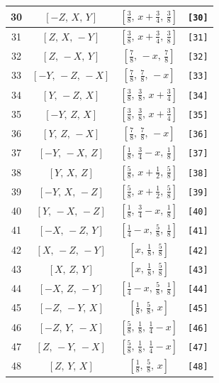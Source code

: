 \documentclass[fleqn,8pt]{jsarticle}
\begin{document}
\begin{longtable}{cccc}
30 & $\left[ - Z,\, X,\, Y \right]$ & $\left[ \frac{3}{8},\, x + \frac{3}{4},\, \frac{3}{8} \right]$ & {\tt [30]} \\ \hline
31 & $\left[ Z,\, X,\, - Y \right]$ & $\left[ \frac{3}{8},\, x + \frac{3}{4},\, \frac{3}{8} \right]$ & {\tt [31]} \\ \hline
32 & $\left[ Z,\, - X,\, Y \right]$ & $\left[ \frac{7}{8},\, - x,\, \frac{7}{8} \right]$ & {\tt [32]} \\ \hline
33 & $\left[ - Y,\, - Z,\, - X \right]$ & $\left[ \frac{7}{8},\, \frac{7}{8},\, - x \right]$ & {\tt [33]} \\ \hline
34 & $\left[ Y,\, - Z,\, X \right]$ & $\left[ \frac{3}{8},\, \frac{3}{8},\, x + \frac{3}{4} \right]$ & {\tt [34]} \\ \hline
35 & $\left[ - Y,\, Z,\, X \right]$ & $\left[ \frac{3}{8},\, \frac{3}{8},\, x + \frac{3}{4} \right]$ & {\tt [35]} \\ \hline
36 & $\left[ Y,\, Z,\, - X \right]$ & $\left[ \frac{7}{8},\, \frac{7}{8},\, - x \right]$ & {\tt [36]} \\ \hline
37 & $\left[ - Y,\, - X,\, Z \right]$ & $\left[ \frac{1}{8},\, \frac{3}{4} - x,\, \frac{1}{8} \right]$ & {\tt [37]} \\ \hline
38 & $\left[ Y,\, X,\, Z \right]$ & $\left[ \frac{5}{8},\, x + \frac{1}{2},\, \frac{5}{8} \right]$ & {\tt [38]} \\ \hline
39 & $\left[ - Y,\, X,\, - Z \right]$ & $\left[ \frac{5}{8},\, x + \frac{1}{2},\, \frac{5}{8} \right]$ & {\tt [39]} \\ \hline
40 & $\left[ Y,\, - X,\, - Z \right]$ & $\left[ \frac{1}{8},\, \frac{3}{4} - x,\, \frac{1}{8} \right]$ & {\tt [40]} \\ \hline
41 & $\left[ - X,\, - Z,\, Y \right]$ & $\left[ \frac{1}{4} - x,\, \frac{5}{8},\, \frac{1}{8} \right]$ & {\tt [41]} \\ \hline
42 & $\left[ X,\, - Z,\, - Y \right]$ & $\left[ x,\, \frac{1}{8},\, \frac{5}{8} \right]$ & {\tt [42]} \\ \hline
43 & $\left[ X,\, Z,\, Y \right]$ & $\left[ x,\, \frac{1}{8},\, \frac{5}{8} \right]$ & {\tt [43]} \\ \hline
44 & $\left[ - X,\, Z,\, - Y \right]$ & $\left[ \frac{1}{4} - x,\, \frac{5}{8},\, \frac{1}{8} \right]$ & {\tt [44]} \\ \hline
45 & $\left[ - Z,\, - Y,\, X \right]$ & $\left[ \frac{1}{8},\, \frac{5}{8},\, x \right]$ & {\tt [45]} \\ \hline
46 & $\left[ - Z,\, Y,\, - X \right]$ & $\left[ \frac{5}{8},\, \frac{1}{8},\, \frac{1}{4} - x \right]$ & {\tt [46]} \\ \hline
47 & $\left[ Z,\, - Y,\, - X \right]$ & $\left[ \frac{5}{8},\, \frac{1}{8},\, \frac{1}{4} - x \right]$ & {\tt [47]} \\ \hline
48 & $\left[ Z,\, Y,\, X \right]$ & $\left[ \frac{1}{8},\, \frac{5}{8},\, x \right]$ & {\tt [48]} \\
\end{longtable}
\end{document}
